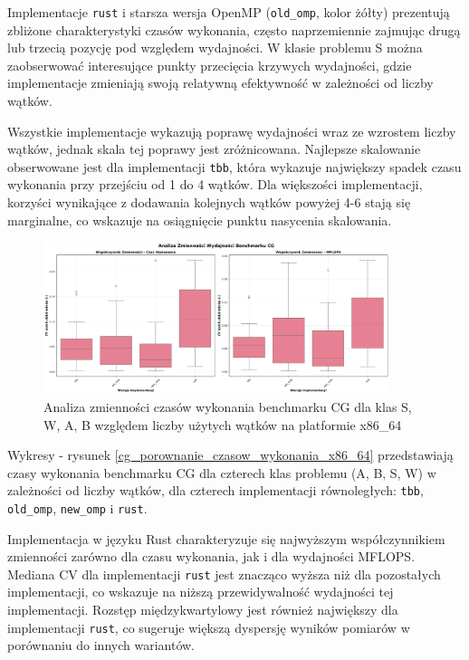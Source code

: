 Implementacje \texttt{rust} i starsza wersja OpenMP (\texttt{old\_omp}, kolor żółty) prezentują zbliżone charakterystyki czasów wykonania, często naprzemiennie zajmując drugą lub trzecią pozycję pod względem wydajności. W klasie problemu S można zaobserwować interesujące punkty przecięcia krzywych wydajności, gdzie implementacje zmieniają swoją relatywną efektywność w zależności od liczby wątków.

Wszystkie implementacje wykazują poprawę wydajności wraz ze wzrostem liczby wątków, jednak skala tej poprawy jest zróżnicowana. Najlepsze skalowanie obserwowane jest dla implementacji \texttt{tbb}, która wykazuje największy spadek czasu wykonania przy przejściu od 1 do 4 wątków. Dla większości implementacji, korzyści wynikające z dodawania kolejnych wątków powyżej 4-6 stają się marginalne, co wskazuje na osiągnięcie punktu nasycenia skalowania.

\begin{figure}[H]
    \centering
    \includegraphics[width=0.9\textwidth]{analiza/images/parallel/cg/x86/cg_analiza_zmiennosci.png}
    \caption{Analiza zmienności czasów wykonania benchmarku CG dla klas S, W, A, B względem liczby użytych wątków na platformie x86\_64}
    \label{cg_analiza_zmiennosci_x86_64}
\end{figure}
Wykresy - rysunek \ref{cg_porownanie_czasow_wykonania_x86_64} przedstawiają czasy wykonania benchmarku CG dla czterech klas problemu (A, B, S, W) w zależności od liczby wątków, dla czterech implementacji równoległych: \texttt{tbb}, \texttt{old\_omp}, \texttt{new\_omp} i \texttt{rust}.

Implementacja w języku Rust charakteryzuje się najwyższym współczynnikiem zmienności zarówno dla czasu wykonania, jak i dla wydajności MFLOPS. Mediana CV dla implementacji \texttt{rust} jest znacząco wyższa niż dla pozostałych implementacji, co wskazuje na niższą przewidywalność wydajności tej implementacji. Rozstęp międzykwartylowy jest również największy dla implementacji \texttt{rust}, co sugeruje większą dyspersję wyników pomiarów w porównaniu do innych wariantów.

